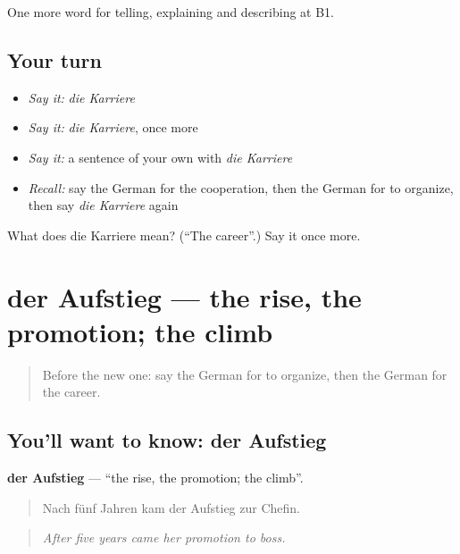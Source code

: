 \begin{grammarlens}[title={What you've built}]
One more word for telling, explaining and describing at B1.
\end{grammarlens}

\subsection*{Your turn}
\begin{itemize}
\raggedright
  \item \emph{Say it:} \emph{die Karriere}
  \item \emph{Say it:} \emph{die Karriere}, once more
  \item \emph{Say it:} a sentence of your own with \emph{die Karriere}
  \item \emph{Recall:} say the German for the cooperation, then the German for to organize, then say \emph{die Karriere} again
\end{itemize}

\begin{tcolorbox}[breakable,colback=teal!4,colframe=teal!35!black,title={Before you move on}]
What does die Karriere mean? (\textquotedblleft{}The career\textquotedblright{}.) Say it once more.
\end{tcolorbox}
\section[der Aufstieg]{der Aufstieg — the rise, the promotion; the climb}

\label{lesson:GE-C356-aufstieg}



\begin{quote}
Before the new one: say the German for to organize, then the German for the career.
\end{quote}

\subsection*{You'll want to know: der Aufstieg}
\textbf{der Aufstieg} — \textquotedblleft{}the rise, the promotion; the climb\textquotedblright{}.

\begin{quote}
Nach fünf Jahren kam der Aufstieg zur Chefin.
\end{quote}

\begin{quote}
\emph{After five years came her promotion to boss.}
\end{quote}


